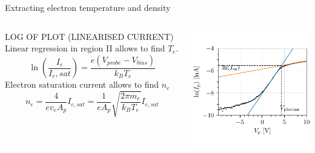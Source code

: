 \documentclass[10pt]{beamer}
\begin{document}
\begin{frame}{Extracting electron temperature and density}
    \begin{columns}
        LOG OF PLOT (LINEARISED CURRENT)
        Linear regression in region II allows to find $T_e$.
        \begin{equation*}
            \ln\left(\frac{I_e}{I_e,sat} \right) = \frac{e(V_{probe} - V_{bias})}{k_B T_e}
        \end{equation*} 
        Electron saturation current allows to find $n_e$
        \begin{equation*}
            n_e = \frac{4}{e v_e A_p} I_{e,sat} = \frac{1}{e A_p} \sqrt{\frac{2 \pi m_e}{k_B T_e}} I_{e,sat}
        \end{equation*}

        \includegraphics[scale=1]{../figures/IV_fit.pdf}
    \end{columns}
\end{frame}
\end{document}
